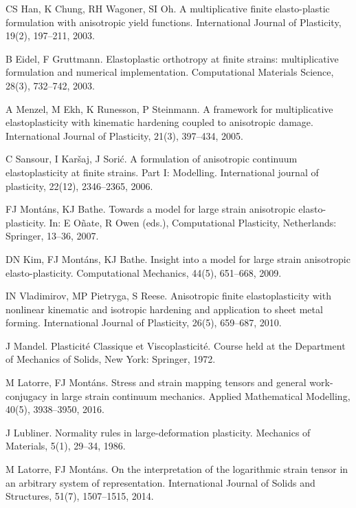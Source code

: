 \documentclass[preprint,review,12pt,sort&compress]{elsarticle}%
\begin{document}
\begin{thebibliography}{99}
CS Han, K Chung, RH Wagoner, SI Oh. A multiplicative
finite elasto-plastic formulation with anisotropic yield functions.
International Journal of Plasticity, 19(2), 197--211, 2003.

B Eidel, F Gruttmann. Elastoplastic orthotropy at
finite strains: multiplicative formulation and numerical implementation.
Computational Materials Science, 28(3), 732--742, 2003.

A Menzel, M Ekh, K Runesson, P Steinmann. A framework
for multiplicative elastoplasticity with kinematic hardening coupled to
anisotropic damage. International Journal of Plasticity, 21(3), 397--434, 2005.

C Sansour, I Kar\v{s}aj, J Sori\'{c}. A
formulation of anisotropic continuum elastoplasticity at finite strains. Part
I: Modelling. International journal of plasticity, 22(12), 2346--2365, 2006.

FJ Mont\'{a}ns, KJ Bathe. Towards a model for large
strain anisotropic elasto-plasticity. In: E O\~{n}ate, R Owen (eds.),
Computational Plasticity, Netherlands: Springer, 13--36, 2007.

DN Kim, FJ Mont\'{a}ns, KJ Bathe. Insight into a
model for large strain anisotropic elasto-plasticity. Computational Mechanics,
44(5), 651--668, 2009.

IN Vladimirov, MP Pietryga, S Reese.
Anisotropic finite elastoplasticity with nonlinear kinematic and isotropic
hardening and application to sheet metal forming. International Journal of
Plasticity, 26(5), 659--687, 2010.

J Mandel. Plasticit\'{e} Classique et Viscoplasticit\'{e}.
Course held at the Department of Mechanics of Solids, New York: Springer, 1972.

M Latorre, FJ Mont\'{a}ns. Stress and strain mapping
tensors and general work-conjugacy in large strain continuum mechanics.
Applied Mathematical Modelling, 40(5), 3938--3950, 2016.

J Lubliner. Normality rules in large-deformation
plasticity. Mechanics of Materials, 5(1), 29--34, 1986.

M Latorre, FJ Mont\'{a}ns. On the interpretation of
the logarithmic strain tensor in an arbitrary system of representation.
International Journal of Solids and Structures, 51(7), 1507--1515, 2014.


\end{thebibliography}
\end{document}
